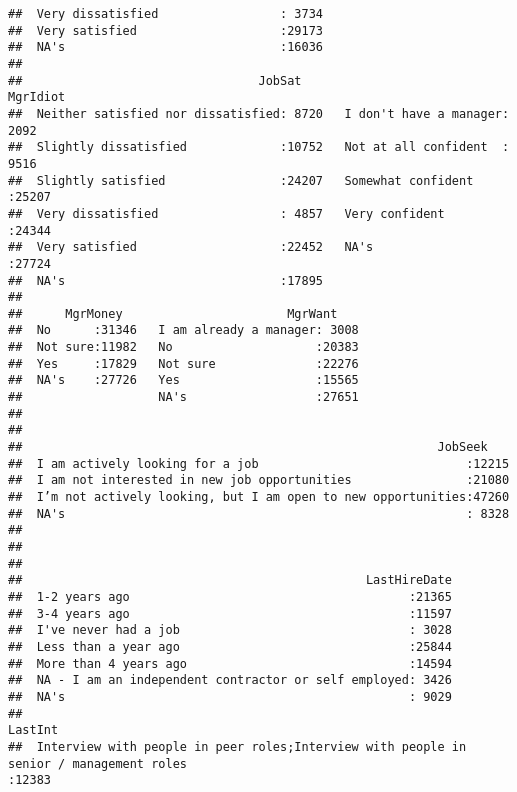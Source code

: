 \documentclass[]{article}
\begin{document}
\begin{verbatim}
##  Very dissatisfied                 : 3734  
##  Very satisfied                    :29173  
##  NA's                              :16036  
##                                            
##                                 JobSat                        MgrIdiot    
##  Neither satisfied nor dissatisfied: 8720   I don't have a manager: 2092  
##  Slightly dissatisfied             :10752   Not at all confident  : 9516  
##  Slightly satisfied                :24207   Somewhat confident    :25207  
##  Very dissatisfied                 : 4857   Very confident        :24344  
##  Very satisfied                    :22452   NA's                  :27724  
##  NA's                              :17895                                 
##                                                                           
##      MgrMoney                       MgrWant     
##  No      :31346   I am already a manager: 3008  
##  Not sure:11982   No                    :20383  
##  Yes     :17829   Not sure              :22276  
##  NA's    :27726   Yes                   :15565  
##                   NA's                  :27651  
##                                                 
##                                                 
##                                                          JobSeek     
##  I am actively looking for a job                             :12215  
##  I am not interested in new job opportunities                :21080  
##  I’m not actively looking, but I am open to new opportunities:47260  
##  NA's                                                        : 8328  
##                                                                      
##                                                                      
##                                                                      
##                                                LastHireDate  
##  1-2 years ago                                       :21365  
##  3-4 years ago                                       :11597  
##  I've never had a job                                : 3028  
##  Less than a year ago                                :25844  
##  More than 4 years ago                               :14594  
##  NA - I am an independent contractor or self employed: 3426  
##  NA's                                                : 9029  
##                                                                                                                                              LastInt     
##  Interview with people in peer roles;Interview with people in senior / management roles                                                          :12383  

\end{verbatim}
\end{document}
